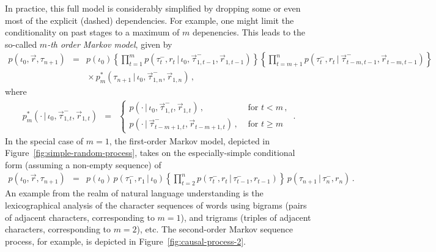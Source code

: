 \documentclass[a4paper]{article}
\newcommand{\vr}{\vec{r}}
\newcommand{\tm}{\tau^{-}}
\begin{document}
In practice, this full model is considerably simplified by dropping some or even most of the explicit (dashed) dependencies.
For example, one might limit the 
conditionality on past stages to a maximum of $m$ depenencies.
This leads to the so-called {\em $m$-th order Markov model},
given by
\begin{eqnarray}
p(\iota_0,\vr,\tau_{n+1}) & = &
p(\iota_0)
\left\{\prod_{t=1}^{m}p(\tm_t,r_t\,|\,\iota_0,\vec{\tau}^-_{1,t-1},\vr_{1,t-1})\right\}
\left\{\prod_{t=m+1}^{n}p(\tm_t,r_t\,|\,\vec{\tau}^-_{t-m,t-1},\vr_{t-m,t-1})\right\}
\nonumber\\&&
{}\times p_m^*(\tau_{n+1}\,|\,\iota_0,\vec{\tau}^-_{1,n},\vr_{1,n})
\,,
\label{eq:m-th-order}
\end{eqnarray}
where
\begin{eqnarray}
 p_m^*(\cdot\,|\,\iota_0,\vec{\tau}^-_{1,t},\vr_{1,t}) & = & \left\{\begin{array}{ll}
 p(\cdot\,|\,\iota_0,\vec{\tau}^-_{1,t},\vr_{1,t})\,, &
\mbox{ for $t<m$}\,,
\\
 p(\cdot\,|\,\vec{\tau}^-_{t-m+1,t},\vr_{t-m+1,t})\,, &
\mbox{ for $t\ge m$}
\end{array}\right.\,.
\end{eqnarray}
In the special case of $m=1$, the first-order Markov model,
depicted in Figure~\ref{fig:simple-random-process}, takes on the especially-simple conditional form
(assuming a non-empty sequence) of
\begin{eqnarray}
p(\iota_0,\vr,\tau_{n+1}) & = &
p(\iota_0)\,p(\tm_1,r_1\,|\,\iota_0)
\left\{\prod_{t=2}^{n}p(\tm_t,r_t\,|\,\tm_{t-1},r_{t-1})\right\}
\,p(\tau_{n+1}\,|\,\tm_n,r_n)
\,.
\end{eqnarray}
An example from the realm of natural language understanding is the lexicographical analysis of the character
sequences of words using bigrams (pairs of adjacent characters, corresponding to $m=1$), and trigrams 
(triples of adjacent characters, corresponding to $m=2$), etc.
The second-order Markov sequence process, for example, is depicted in Figure~\ref{fig:causal-process-2}.
\end{document}

